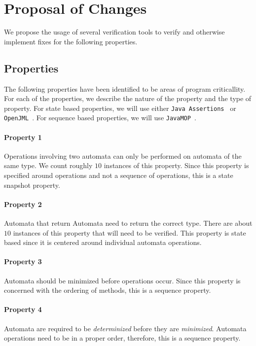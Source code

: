 \documentclass[letterpaper,11pt,twocolumn]{article}
\begin{document}
\section{Proposal of Changes}

We propose the usage of several verification tools to verify and otherwise
implement fixes for the following properties.

\subsection{Properties}

The following properties have been identified to be areas of program
criticallity.  For each of the properties, we describe the nature of the
property and the type of property.  For state based properties, we will use
either \texttt{Java Assertions}~\cite{oracle-java-assertions} or
\texttt{OpenJML}~\cite{openjml}.  For sequence based properties, we will use
\texttt{JavaMOP}~\cite{javamop}.

\paragraph{Property 1} Operations involving two automata can only be performed
on automata of the same type.  We count roughly \(10\) instances of this
property.  Since this property is specified around operations and not a
sequence of operations, this is a state snapshot property.

\paragraph{Property 2} Automata that return Automata need to return the correct
type.  There are about \(10\) instances of this property that will need to be
verified.  This property is state based since it is centered around individual
automata operations.

\paragraph{Property 3} Automata should be minimized before operations occur.
Since this property is concerned with the ordering of methods, this is a
sequence property.

\paragraph{Property 4} Automata are required to be \textit{determinized} before
they are \textit{minimized}.  Automata operations need to be in a proper order,
therefore, this is a sequence property.
\end{document}
